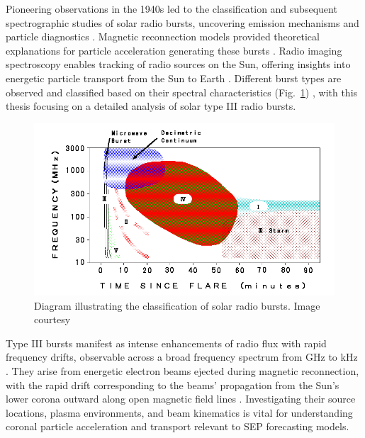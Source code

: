 Pioneering observations in the 1940s led to the classification and subsequent spectrographic studies of solar radio bursts, uncovering emission mechanisms and particle diagnostics \citep{wild_1963, suzuki_1985}. Magnetic reconnection models provided theoretical explanations for particle acceleration generating these bursts \citep{holman_2011}. Radio imaging spectroscopy enables tracking of radio sources on the Sun, offering insights into energetic particle transport from the Sun to Earth \citep{krucker_2011, klassen_2003a, klassen_2003b}. Different burst types are observed and classified based on their spectral characteristics (Fig.~\ref{fig_srb_types}) \citep{wild_1963}, with this thesis focusing on a detailed analysis of solar type III radio bursts.

\begin{figure}[!htp]
	\centering
	\includegraphics[width=0.8\columnwidth]{chapter1/figs/typefignew.png}
	\caption[Classification of solar radio bursts]{Diagram illustrating the classification of solar radio bursts. Image courtesy\protect\footnotemark}
	\label{fig_srb_types}
\end{figure}

Type III bursts manifest as intense enhancements of radio flux with rapid frequency drifts, observable across a broad frequency spectrum from GHz to kHz \citep{wild_1950a, lecacheux_1989, bonnin_2008}. They arise from energetic electron beams ejected during magnetic reconnection, with the rapid drift corresponding to the beams' propagation from the Sun's lower corona outward along open magnetic field lines \citep{cane_2002, macdowall_2003}. Investigating their source locations, plasma environments, and beam kinematics is vital for understanding coronal particle acceleration and transport relevant to SEP forecasting models.

